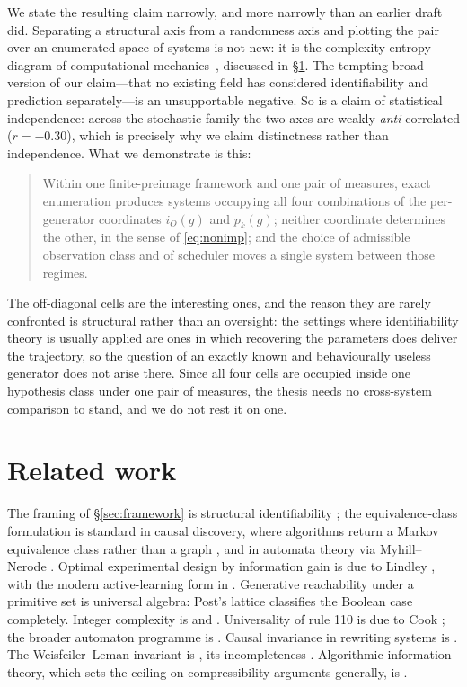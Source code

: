 \documentclass[11pt]{article}
\begin{document}
We state the resulting claim narrowly, and more narrowly than an earlier draft did.
Separating a structural axis from a randomness axis and plotting the pair over an
enumerated space of systems is not new: it is the complexity-entropy diagram of
computational mechanics~\cite{feldman2008}, discussed in \S\ref{sec:related}. The
tempting broad version of our claim---that no existing field has considered
identifiability and prediction separately---is an unsupportable negative. So is a claim of statistical independence: across the stochastic family the two
axes are weakly \emph{anti}-correlated ($r = -0.30$), which is precisely why we claim
distinctness rather than independence. What we demonstrate is this:
\begin{quote}
Within one finite-preimage framework and one pair of measures, exact enumeration
produces systems occupying all four combinations of the per-generator coordinates
$i_O(g)$ and $p_k(g)$; neither coordinate determines the other, in the sense of
\eqref{eq:nonimp}; and the choice of admissible observation class and of scheduler moves
a single system between those regimes.
\end{quote}
The off-diagonal cells are the interesting ones, and the reason they are rarely
confronted is structural rather than an oversight: the settings where identifiability
theory is usually applied are ones in which recovering the parameters does deliver the
trajectory, so the question of an exactly known and behaviourally useless generator does
not arise there. Since all four cells are occupied inside one hypothesis class under one
pair of measures, the thesis needs no cross-system comparison to stand, and we do not rest
it on one.

\section{Related work}\label{sec:related}

The framing of \S\ref{sec:framework} is structural identifiability
\cite{bellman1970,walter1997}; the equivalence-class formulation is standard in causal
discovery, where algorithms return a Markov equivalence class rather than a graph
\cite{verma1990,pearl2009}, and in automata theory via Myhill--Nerode
\cite{nerode1958}. Optimal experimental design by information gain is due to Lindley
\cite{lindley1956}, with the modern active-learning form in \cite{houlsby2011}.
Generative reachability under a primitive set is universal algebra: Post's lattice
\cite{post1941} classifies the Boolean case completely. Integer complexity is
\cite{oeis005245} and \cite[\S F26]{guy2004}. Universality of rule 110 is due to Cook
\cite{cook2004}; the broader automaton programme is \cite{wolfram2002}. Causal
invariance in rewriting systems is \cite{wolfram2020}. The Weisfeiler--Leman invariant
is \cite{weisfeiler1968}, its incompleteness \cite{cai1992}. Algorithmic information
theory, which sets the ceiling on compressibility arguments generally, is
\cite{livitanyi2008}.
\end{document}
